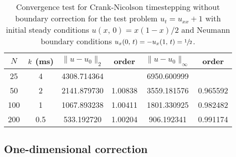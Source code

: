 \begin{table}[t]
\centering
\caption[Convergence of Neumann boundary errors on a staggered grid]{%
    Convergence test for Crank-Nicolson timestepping without boundary correction for the
    test problem $u_t = u_{xx} + 1$ with initial steady conditions $u(x,\,0) = x(1-x)/2$
    and Neumann boundary conditions $u_x(0,\,t) = -u_x(1,\,t) = \sfrac12$.
}\label{tab:neu-bdy-conv}
\begingroup
\setlength{\tabcolsep}{9pt}
\renewcommand{\arraystretch}{1.5}
\begin{tabular}{cc|cc|cc}
    \toprule
    $N$ & $k$ (ms) & $\|u-u_0\|_2$ &   order & $\|u-u_0\|_{\infty}$ &   order  \\ \midrule
     25 & 4                &   4308.714364 &         &          6950.600999 &          \\
     50 & 2                &   2141.879730 & 1.00838 &          3559.181576 & 0.965592 \\
    100 & 1                &   1067.893238 & 1.00411 &          1801.330925 & 0.982482 \\
    200 & 0.5              &    533.192720 & 1.00204 &           906.192341 & 0.991174 \\
    \bottomrule
\end{tabular}
\endgroup
\end{table}


\subsection{One-dimensional correction}

